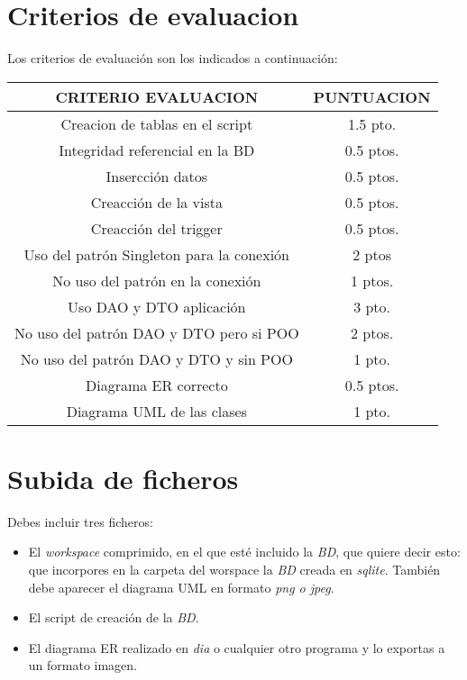 \documentclass[4paper]{article}
\begin{document}
\section*{Criterios de evaluacion}
Los criterios de evaluación son los indicados a continuación:\par 
\vspace*{0.5cm}
\begin{tabular}{|c|c|}
\hline
\textbf{CRITERIO EVALUACION} & \textbf{PUNTUACION} \\
\hline
Creacion de tablas en el script & 1.5 pto.\\
\hline
Integridad referencial en la BD & 0.5 ptos.\\
\hline
Insercción datos & 0.5 ptos.\\
\hline
Creacción de la vista & 0.5 ptos.\\
\hline
Creacción del trigger & 0.5 ptos.\\
\hline
Uso del patrón Singleton para la conexión  & 2 ptos\\
\hline
No uso del patrón en la conexión & 1 ptos.\\
\hline
Uso DAO y DTO aplicación & 3 pto.\\
\hline 
No uso del patrón DAO y DTO pero si POO  & 2 ptos.\\
\hline
No uso del patrón DAO y DTO y sin POO & 1 pto.\\
\hline
Diagrama ER correcto & 0.5 ptos.\\
\hline
Diagrama UML  de las clases& 1 pto.\\
\hline
\end{tabular}
\section*{Subida de ficheros}
Debes incluir tres ficheros:
\begin{itemize}
\item El \emph{workspace} comprimido, en el que esté incluido la \emph{BD}, que quiere decir esto: que incorpores en la carpeta del worspace la \emph{BD} creada en \emph{sqlite}. También debe aparecer el diagrama UML en formato \emph{png o jpeg}.
\item El script de creación de la \emph{BD}.
\item El diagrama ER realizado en \emph{dia} o cualquier otro programa y lo exportas a un formato imagen.
\end{itemize}
\end{document}
